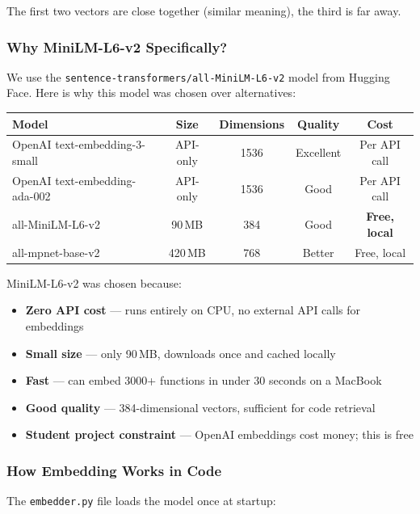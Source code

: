 \documentclass[a4paper,11pt]{article}
\begin{document}
The first two vectors are close together (similar meaning), the third is far away.

\subsubsection{Why MiniLM-L6-v2 Specifically?}
We use the \texttt{sentence-transformers/all-MiniLM-L6-v2} model from Hugging Face. Here is why this model was chosen over alternatives:

\vspace{6pt}
\begin{center}
\begin{tabular}{@{}lcccc@{}}
\toprule
\textbf{Model} & \textbf{Size} & \textbf{Dimensions} & \textbf{Quality} & \textbf{Cost} \\
\midrule
OpenAI text-embedding-3-small & API-only & 1536 & Excellent & Per API call \\
OpenAI text-embedding-ada-002 & API-only & 1536 & Good      & Per API call \\
all-MiniLM-L6-v2              & 90\,MB   & 384  & Good      & \textbf{Free, local} \\
all-mpnet-base-v2             & 420\,MB  & 768  & Better    & Free, local \\
\bottomrule
\end{tabular}
\end{center}
\vspace{6pt}

MiniLM-L6-v2 was chosen because:
\begin{itemize}
    \item \textbf{Zero API cost} --- runs entirely on CPU, no external API calls for embeddings
    \item \textbf{Small size} --- only 90\,MB, downloads once and cached locally
    \item \textbf{Fast} --- can embed 3000+ functions in under 30 seconds on a MacBook
    \item \textbf{Good quality} --- 384-dimensional vectors, sufficient for code retrieval
    \item \textbf{Student project constraint} --- OpenAI embeddings cost money; this is free
\end{itemize}

\subsubsection{How Embedding Works in Code}
The \texttt{embedder.py} file loads the model once at startup:
\end{document}
